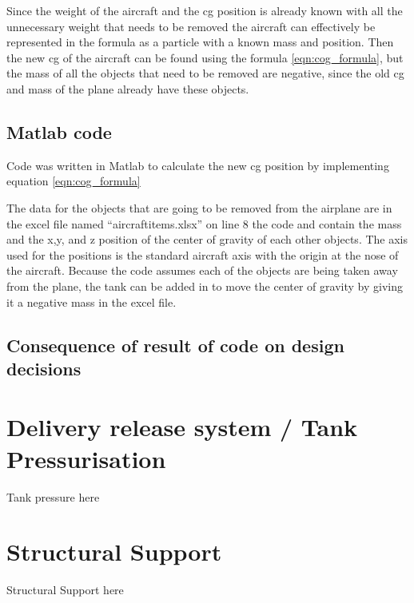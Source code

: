Since the weight of the aircraft and the cg position is already known with all the unnecessary weight that needs to be removed the aircraft can effectively be represented in the formula as a particle with a known mass and position.
Then the new cg of the aircraft can be found using the formula \ref{eqn:cog_formula}, but the mass of all the objects that need to be removed are negative, since the old cg and mass of the plane already have these objects.


\subsection{Matlab code}
Code was written in Matlab to calculate the new cg position by implementing equation \ref{eqn:cog_formula}



The data for the objects that are going to be removed from the airplane are in the excel file named “aircraftitems.xlsx” on line 8 the code and contain the mass and the x,y, and z position of the center of gravity of each other objects.
The axis used for the positions is the standard aircraft axis with the origin at the nose of the aircraft.
Because the code assumes each of the objects are being taken away from the plane, the tank can be added in to move the center of gravity by giving it a negative mass in the excel file.

\subsection{Consequence of result of code on design decisions}



\section{Delivery release system / Tank Pressurisation}
Tank pressure here
\section{Structural Support}
Structural Support here
